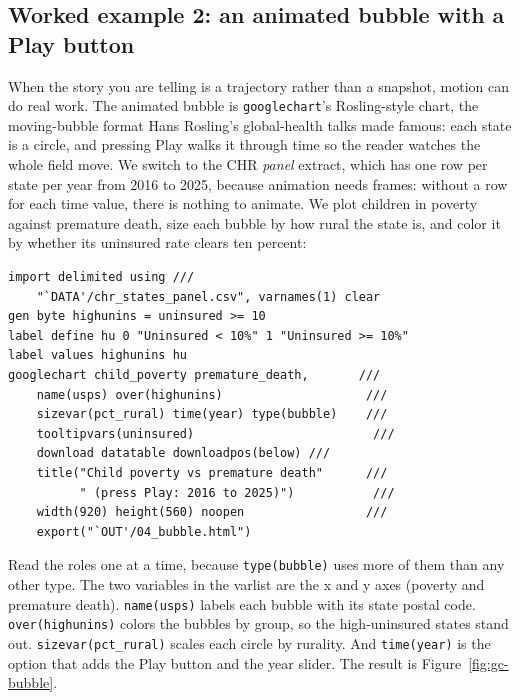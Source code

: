 \subsection{Worked example 2: an animated bubble with a Play button}\label{sec:gc-bubble}
When the story you are telling is a trajectory rather than a snapshot, motion can do real work. The animated bubble is \texttt{googlechart}'s Rosling-style chart, the moving-bubble format Hans Rosling's global-health talks made famous: each state is a circle, and pressing Play walks it through time so the reader watches the whole field move. We switch to the CHR \emph{panel} extract, which has one row per state per year from 2016 to 2025, because animation needs frames: without a row for each time value, there is nothing to animate. We plot children in poverty against premature death, size each bubble by how rural the state is, and color it by whether its uninsured rate clears ten percent:
\par
{\footnotesize
\begin{verbatim}
import delimited using ///
    "`DATA'/chr_states_panel.csv", varnames(1) clear
gen byte highunins = uninsured >= 10
label define hu 0 "Uninsured < 10%" 1 "Uninsured >= 10%"
label values highunins hu
googlechart child_poverty premature_death,       ///
    name(usps) over(highunins)                    ///
    sizevar(pct_rural) time(year) type(bubble)    ///
    tooltipvars(uninsured)                         ///
    download datatable downloadpos(below) ///
    title("Child poverty vs premature death"      ///
          " (press Play: 2016 to 2025)")           ///
    width(920) height(560) noopen                 ///
    export("`OUT'/04_bubble.html")
\end{verbatim}
}
Read the roles one at a time, because \texttt{type(bubble)} uses more of them than any other type. The two variables in the varlist are the x and y axes (poverty and premature death). \texttt{name(usps)} labels each bubble with its state postal code. \texttt{over(highunins)} colors the bubbles by group, so the high-uninsured states stand out. \texttt{sizevar(pct\_rural)} scales each circle by rurality. And \texttt{time(year)} is the option that adds the Play button and the year slider. The result is Figure~\ref{fig:gc-bubble}.

